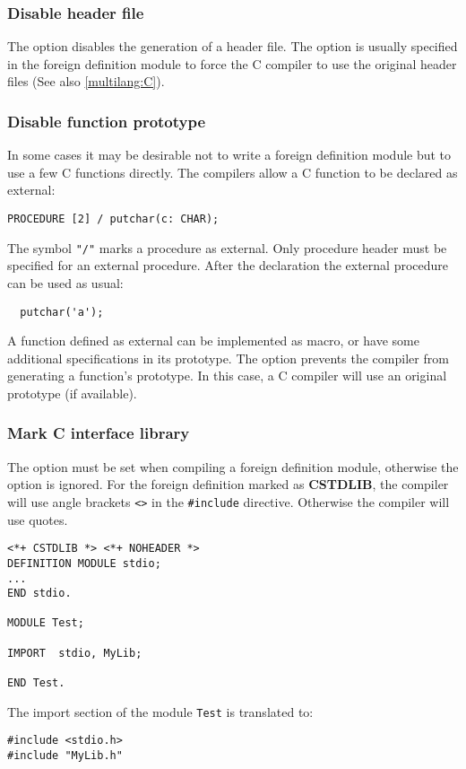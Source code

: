 \subsubsection{Disable header file}

The  option disables
the  generation of a header file. The option is usually specified
in  the  foreign definition module to force the C compiler to use
the original header files (See also \ref{multilang:C}).

\subsubsection{Disable function prototype}

In  some  cases  it  may  be  desirable  not  to  write a foreign
definition module but to use a few C functions directly.
The \xds{} compilers allow a C function to be declared as external:
\begin{verbatim}
PROCEDURE [2] / putchar(c: CHAR);
\end{verbatim}
The symbol \verb|"/"| marks a procedure as external. Only
procedure header must be specified for an external procedure.
After the declaration the external procedure can be used
as usual:
\begin{verbatim}
  putchar('a');
\end{verbatim}
A  function  defined  as external can be implemented as macro, or
have  some  additional  specifications in its prototype. The 
option  prevents the compiler from generating  a function's prototype.
In this case, a C compiler will use an original prototype (if available).

\subsubsection{Mark C interface library}

The 
option must be set when compiling a foreign definition
module, otherwise the option is ignored.
For the foreign definition marked as {\bf CSTDLIB},
the compiler will use angle brackets \verb+<>+
in the \verb|#include| directive.
Otherwise the compiler will use quotes.
\Example
\begin{verbatim}
<*+ CSTDLIB *> <*+ NOHEADER *>
DEFINITION MODULE stdio;
...
END stdio.

MODULE Test;

IMPORT  stdio, MyLib;

END Test.
\end{verbatim}
The import section of the module {\tt Test} is translated to:
\begin{verbatim}
#include <stdio.h>
#include "MyLib.h"
\end{verbatim}

